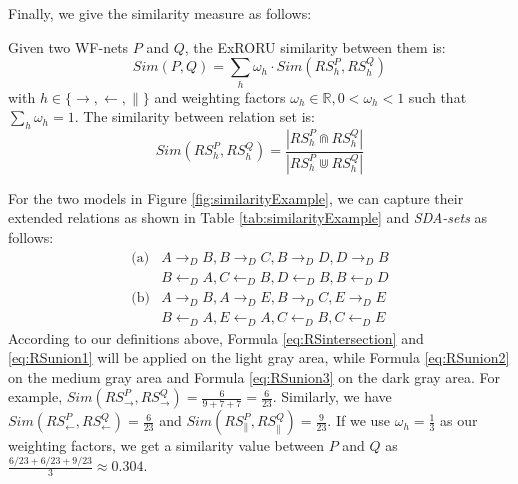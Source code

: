 \documentclass[dvips,...]{llncs}
\begin{document}
Finally, we give the similarity measure as follows:

\begin{definition}\label{def:similarity}
Given two WF-nets $P$ and $Q$, the ExRORU similarity between them is:\\
\begin{equation}\label{eq:similarity}
Sim(P,Q)=\sum_{h}\omega_{h}\cdot Sim(RS_{h}^{P},RS_{h}^{Q})
\end{equation}
with $h\in\{\rightarrow,\leftarrow,\parallel\}$ and weighting factors $\omega_{h}\in\mathbb{R},0<\omega_{h}<1$ such that $\sum\limits_{h}\omega_{h}=1$. The similarity between relation set is:\\
\begin{equation}\label{eq:setsimilarity}
Sim(RS_{h}^{P},RS_{h}^{Q})=\frac{|RS_{h}^{P}\Cap RS_{h}^{Q}|}{|RS_{h}^{P}\Cup RS_{h}^{Q}|}
\end{equation}
\end{definition}

\begin{example}\label{ex:similarity}
For the two models in Figure \ref{fig:similarityExample}, we can capture their extended relations as shown in Table \ref{tab:similarityExample} and \textit{SDA-sets} as follows:
\begin{displaymath}
	\begin{aligned}
		\text{(a)} & A\rightarrow_{D}B, B\rightarrow_{D}C, B\rightarrow_{D}D, D\rightarrow_{D}B\\
		& B\leftarrow_{D}A, C\leftarrow_{D}B, D\leftarrow_{D}B, B\leftarrow_{D}D\\
		\text{(b)} & A\rightarrow_{D}B, A\rightarrow_{D}E, B\rightarrow_{D}C, E\rightarrow_{D}E\\
		& B\leftarrow_{D}A, E\leftarrow_{D}A, C\leftarrow_{D}B, C\leftarrow_{D}E
	\end{aligned}
\end{displaymath}
According to our definitions above, Formula \ref{eq:RSintersection} and \ref{eq:RSunion1} will be applied on the light gray area, while Formula \ref{eq:RSunion2} on the medium gray area and Formula \ref{eq:RSunion3} on the dark gray area. For example, $Sim(RS_{\rightarrow}^{P},RS_{\rightarrow}^{Q})=\frac{6}{9+7+7}=\frac{6}{23}$. Similarly, we have $Sim(RS_{\leftarrow}^{P},RS_{\leftarrow}^{Q})=\frac{6}{23}$ and $Sim(RS_{\parallel}^{P},RS_{\parallel}^{Q})=\frac{9}{23}$. If we use $\omega_{h}=\frac{1}{3}$ as our weighting factors, we get a similarity value between $P$ and $Q$ as $\frac{6/23+6/23+9/23}{3}\approx 0.304$.
\end{example}
\end{document}
